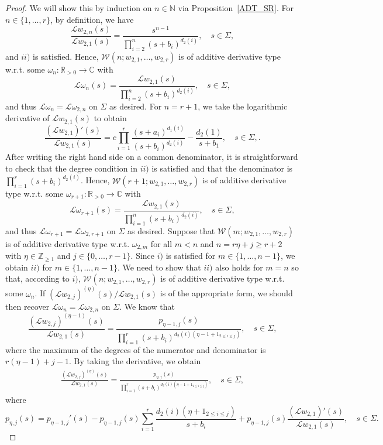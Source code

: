 \documentclass[a4paper,12pt,oneside]{article}
\theoremstyle{definition}
\newcommand{\N}{\mathbb{N}}
\newcommand{\Z}{\mathbb{Z}}
\newcommand{\C}{\mathbb{C}}
\newcommand{\R}{\mathbb{R}}
\newcommand{\om}{\omega}
\newcommand{\LT}[1]{\mathcal{L}#1}
\begin{document}
\begin{proof}
     We will show this by induction on $n\in\N$ via Proposition~\ref{ADT_SR}. For $n\in\{1,\dots,r\}$, by definition, we have 
     $$\frac{\LT{w_{2,n}}(s)}{\LT{w_{2,1}}(s)}=\frac{s^{n-1}}{\prod_{i=2}^{n}(s+b_i)^{d_2(i)}},\quad s\in\Sigma,$$
     and $ii)$ is satisfied. Hence, $\mathcal{W}(n;w_{2,1},\dots,w_{2,r})$ is of additive derivative type w.r.t. some $\om_n:\R_{>0}\to\C$ with
        $$ \LT{\om_n}(s)=\frac{\LT{w_{2,1}}(s)}{\prod_{i=2}^{n}(s+b_i)^{d_2(i)}},\quad s\in\Sigma, $$
    and thus $\LT{\om_n}=\LT{\om_{2,n}}$ on $\Sigma$ as desired. 
    For $n=r+1$, we take the logarithmic derivative of $\LT{w_{2,1}}(s)$ to obtain
        $$ \frac{(\LT{w_{2,1}})'(s)}{\LT{w_{2,1}}(s)} = c \prod_{i=1}^{r} \frac{(s+a_i)^{d_1(i)}}{(s+b_i)^{d_2(i)}} - \frac{d_2(1)}{s+b_1},\quad s\in\Sigma,. $$
    After writing the right hand side on a common denominator, it is straightforward to check that the degree condition in $ii)$ is satisfied and that the denominator is $\prod_{i=1}^r (s+b_i)^{d_2(i)}$. Hence, $\mathcal{W}(r+1;w_{2,1},\dots,w_{2,r})$ is of additive derivative type w.r.t. some $\om_{r+1}:\R_{>0}\to\C$ with
        $$ \LT{\om_{r+1}}(s)=\frac{\LT{w_{2,1}}(s)}{\prod_{i=1}^{n}(s+b_i)^{d_2(i)}},\quad s\in\Sigma, $$
    and thus $\LT{\om_{r+1}}=\LT{\om_{2,r+1}}$ on $\Sigma$ as desired. 
    Suppose that $\mathcal{W}(m;w_{2,1},\dots,w_{2,r})$ is of additive derivative type w.r.t. $\om_{2,m}$ for all $m<n$ and $n=r\eta+j\geq r+2$ with $\eta\in\Z_{\geq 1}$ and $j\in\{0,\dots,r-1\}$. Since $i)$ is satisfied for $m\in\{1,\dots,n-1\}$, we obtain $ii)$ for $m\in\{1,\dots,n-1\}$. We need to show that $ii)$ also holds for $m=n$ so that, according to $i)$, $\mathcal{W}(n;w_{2,1},\dots,w_{2,r})$ is of additive derivative type w.r.t. some $\om_n$. If $(\LT{w_{2,j}})^{(\eta)}(s)/\LT{w_{2,1}}(s)$ is of the appropriate form, we should then recover $\LT{\om_n}=\LT{\om_{2,n}}$ on $\Sigma$. We know that
        $$ \frac{(\LT{w_{2,j}})^{(\eta-1)}(s)}{\LT{w_{2,1}}(s)} = \frac{p_{\eta-1,j}(s)}{\prod_{i=1}^{r} (s+b_i)^{d_2(i)(\eta-1+1_{2\leq i\leq j})}},\quad s\in\Sigma, $$
    where the maximum of the degrees of the numerator and denominator is $r(\eta-1)+j-1$. By taking the derivative, we obtain
    $$\begin{aligned}
        \frac{(\LT{w_{2,j}})^{(\eta)}(s)}{\LT{w_{2,1}}(s)} = \frac{p_{\eta,j}(s)}{\prod_{i=1}^{r} (s+b_i)^{d_2(i)(\eta-1+1_{2\leq i\leq j})}},\quad s\in\Sigma,
    \end{aligned}$$
    where 
    $$p_{\eta,j}(s) =  p_{\eta-1,j}'(s) - p_{\eta-1,j}(s) \sum_{i=1}^r \frac{d_2(i) (\eta+1_{2\leq i\leq j})}{s+b_i} + p_{\eta-1,j}(s) \frac{(\LT{w_{2,1}})'(s)}{\LT{w_{2,1}}(s)},\quad s\in\Sigma.$$

\end{proof}
\end{document}

